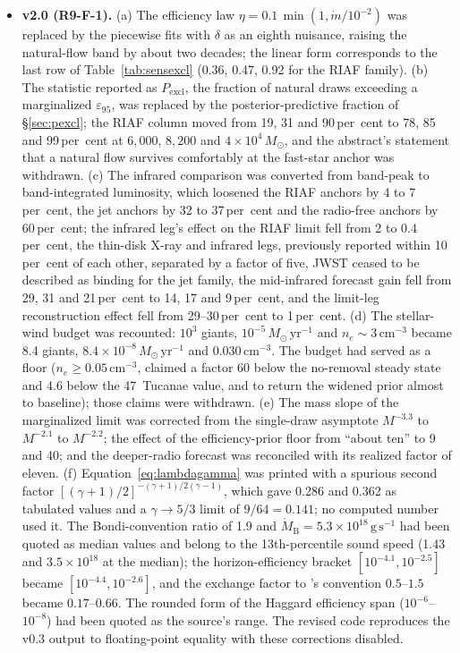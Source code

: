 \documentclass[11pt]{article}
\newcommand{\msun}{\ensuremath{M_\odot}}
\newcommand{\mdotB}{\ensuremath{\dot{M}_{\mathrm{B}}}}
\newcommand{\epsl}{\ensuremath{\varepsilon_{95}}}
\begin{document}
\begin{itemize}
\item \textbf{v2.0 (R9-F-1).} (a) The efficiency law $\eta = 0.1\,\min(1, \dot{m}/10^{-2})$ was replaced by the \citet{XieYuan2012} piecewise fits with $\delta$ as an eighth nuisance, raising the natural-flow band by about two decades; the linear form corresponds to the last row of Table~\ref{tab:sensexcl} (0.36, 0.47, 0.92 for the RIAF family). (b) The statistic reported as $P_{\mathrm{excl}}$, the fraction of natural draws exceeding a marginalized $\epsl$, was replaced by the posterior-predictive fraction of \S\ref{sec:pexcl}; the RIAF column moved from 19, 31 and 90\,per~cent to 78, 85 and 99\,per~cent at $6{,}000$, $8{,}200$ and $4\times10^{4}\,\msun$, and the abstract's statement that a natural flow survives comfortably at the fast-star anchor was withdrawn. (c) The infrared comparison was converted from band-peak to band-integrated luminosity, which loosened the RIAF anchors by 4 to 7\,per~cent, the jet anchors by 32 to 37\,per~cent and the radio-free anchors by 60\,per~cent; the infrared leg's effect on the RIAF limit fell from 2 to 0.4\,per~cent, the thin-disk X-ray and infrared legs, previously reported within 10\,per~cent of each other, separated by a factor of five, JWST ceased to be described as binding for the jet family, the mid-infrared forecast gain fell from 29, 31 and 21\,per~cent to 14, 17 and 9\,per~cent, and the limit-leg reconstruction effect fell from 29--30\,per~cent to 1\,per~cent. (d) The stellar-wind budget was recounted: $10^{3}$ giants, $10^{-5}\,\msun\,\mathrm{yr^{-1}}$ and $n_{e} \sim 3\,\mathrm{cm^{-3}}$ became 8.4 giants, $8.4\times10^{-8}\,\msun\,\mathrm{yr^{-1}}$ and $0.030\,\mathrm{cm^{-3}}$. The budget had served as a floor ($n_{e} \geq 0.05\,\mathrm{cm^{-3}}$, claimed a factor 60 below the no-removal steady state and 4.6 below the 47~Tucanae value, and to return the widened prior almost to baseline); those claims were withdrawn. (e) The mass slope of the marginalized limit was corrected from the single-draw asymptote $M^{-3.3}$ to $M^{-2.1}$ to $M^{-2.2}$; the effect of the efficiency-prior floor from ``about ten'' to 9 and 40; and the deeper-radio forecast was reconciled with its realized factor of eleven. (f) Equation~\ref{eq:lambdagamma} was printed with a spurious second factor $[(\gamma+1)/2]^{-(\gamma+1)/2(\gamma-1)}$, which gave 0.286 and 0.362 as tabulated values and a $\gamma \to 5/3$ limit of $9/64 = 0.141$; no computed number used it. The Bondi-convention ratio of 1.9 and $\mdotB = 5.3\times10^{18}\,\mathrm{g\,s^{-1}}$ had been quoted as median values and belong to the 13th-percentile sound speed (1.43 and $3.5\times10^{18}$ at the median); the horizon-efficiency bracket $[10^{-4.1}, 10^{-2.5}]$ became $[10^{-4.4}, 10^{-2.6}]$, and the exchange factor to \citet{Haggard2013}'s convention $0.5$--$1.5$ became $0.17$--$0.66$. The rounded form of the Haggard efficiency span ($10^{-6}$--$10^{-8}$) had been quoted as the source's range. The revised code reproduces the v0.3 output to floating-point equality with these corrections disabled.

\end{itemize}
\end{document}
